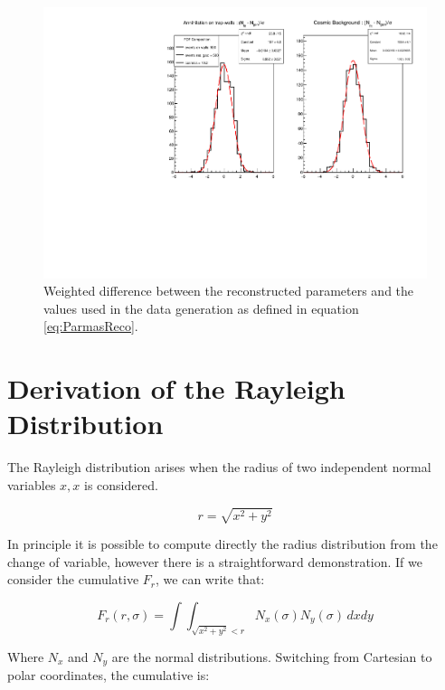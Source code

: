 \documentclass[11pt,a4paper,oneside]{article}
\begin{document}
\begin{figure}[hbtp]
\centering
\includegraphics[width = \textwidth]{../PlotMLEfit/N1000/Reconstruced_(500,500).pdf}
\caption{Weighted difference between the reconstructed parameters and the values used in the data generation as defined in equation \ref{eq:ParmasReco}.}
\label{fig:ReconstructedParameters}
\end{figure}



\appendix
\section{Derivation of the Rayleigh Distribution}
\label{sec:Rayleigh}

The Rayleigh distribution arises when the radius of two independent normal variables $x,x$ is considered.

\begin{equation*}
r = \sqrt{x^{2} + y^{2}}
\end{equation*} 


In principle it is possible to compute directly the radius distribution from the change of variable, however there is a straightforward demonstration. If we consider the cumulative $F_{r}$, we can write that:

\begin{equation*}
F_{r}(r, \sigma) = \int \int_{ \sqrt{x^{2} + y^{2}} < r} N_{x}(\sigma) N_{y}(\sigma) \, dx dy
\end{equation*}

Where $N_{x}$ and $N_{y}$ are the normal distributions. Switching from Cartesian to polar coordinates, the cumulative is:
\end{document}
